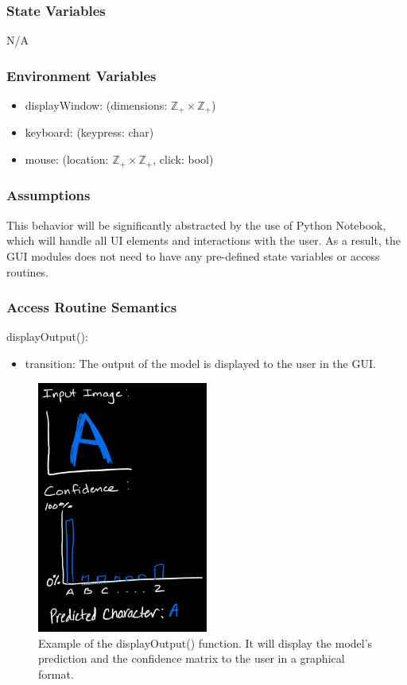 \documentclass[12pt, titlepage]{article}
\begin{document}
\subsubsection{State Variables}

N/A

\subsubsection{Environment Variables}

\begin{itemize}
  \item displayWindow: (dimensions: $\mathbb{Z}_+ \times \mathbb{Z}_+$)
  \item keyboard: (keypress: char)
  \item mouse: (location: $\mathbb{Z}_+ \times \mathbb{Z}_+$, click: bool)
\end{itemize}

\subsubsection{Assumptions}

This behavior will be significantly abstracted by the use of Python Notebook,
which will handle all UI elements and interactions with the user. As a result,
the GUI modules does not need to have any pre-defined state variables or access
routines.

\subsubsection{Access Routine Semantics}

\noindent displayOutput():
\begin{itemize}
\item transition: The output of the model is displayed to the user in the GUI.
\end{itemize}

\begin{figure}
\centering
\includegraphics[width=0.5\textwidth]{displayOutput.jpeg}
\caption{Example of the displayOutput() function. It will display the
  model's prediction and the confidence matrix to the user in a graphical
  format.}
\label{fig:displayOutput}
\end{figure}
\end{document}

